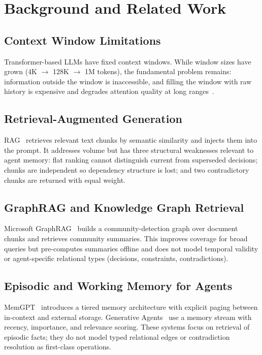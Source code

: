 \documentclass[conference]{IEEEtran}
\begin{document}
\section{Background and Related Work}

\subsection{Context Window Limitations}

Transformer-based LLMs have fixed context windows. While window sizes have grown
(4K $\to$ 128K $\to$ 1M tokens), the fundamental problem remains: information outside the
window is inaccessible, and filling the window with raw history is expensive and degrades
attention quality at long ranges~\cite{hsieh2024ruler}.

\subsection{Retrieval-Augmented Generation}

RAG~\cite{lewis2020rag} retrieves relevant text chunks by semantic similarity and injects
them into the prompt. It addresses volume but has three structural weaknesses relevant to
agent memory: flat ranking cannot distinguish current from superseded decisions; chunks are
independent so dependency structure is lost; and two contradictory chunks are returned with
equal weight.

\subsection{GraphRAG and Knowledge Graph Retrieval}

Microsoft GraphRAG~\cite{edge2024graphrag} builds a community-detection graph over document
chunks and retrieves community summaries. This improves coverage for broad queries but
pre-computes summaries offline and does not model temporal validity or agent-specific
relational types (decisions, constraints, contradictions).

\subsection{Episodic and Working Memory for Agents}

MemGPT~\cite{packer2023memgpt} introduces a tiered memory architecture with explicit paging
between in-context and external storage. Generative Agents~\cite{park2023generative} use a
memory stream with recency, importance, and relevance scoring. These systems focus on
retrieval of episodic facts; they do not model typed relational edges or contradiction
resolution as first-class operations.
\end{document}
